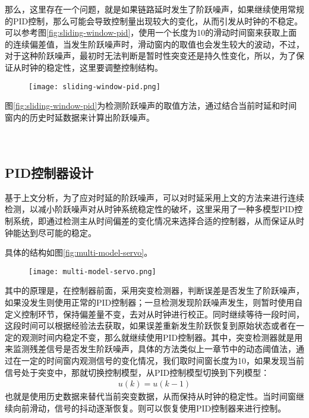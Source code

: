 那么，这里存在一个问题，就是如果链路延时发生了阶跃噪声，如果继续使用常规的PID控制，那么可能会导致控制量出现较大的变化，从而引发从时钟的不稳定。可以参考图\ref{fig:sliding-window-pid}，使用一个长度为10的滑动时间窗来获取上面的连续偏差值，当发生阶跃噪声时，滑动窗内的取值也会发生较大的波动，不过，对于这种阶跃噪声，最初时无法判断是暂时性突变还是持久性变化，所以，为了保证从时钟的稳定性，这里要调整控制结构。

\begin{figure}[htbp]
  \centering
  \begin{minipage}[b]{0.7\textwidth}
   \captionstyle{\centering}
   \centering
   \texttt{[image: sliding-window-pid.png]}
  \end{minipage}     
\end{figure}

图\ref{fig:sliding-window-pid}为检测阶跃噪声的取值方法，通过结合当前时延和时间窗内的历史时延数据来计算出阶跃噪声。
\\ \\ \\
\subsection{PID控制器设计}
基于上文分析，为了应对时延的阶跃噪声，可以对时延采用上文的方法来进行连续检测，以减小阶跃噪声对从时钟系统稳定性的破坏，这里采用了一种多模型PID控制系统，即通过检测主从时间偏差的变化情况来选择合适的控制器，从而保证从时钟能达到尽可能的稳定。

具体的结构如图\ref{fig:multi-model-servo}。
\begin{figure}[htbp]
  \centering
  \begin{minipage}[b]{0.7\textwidth}
   \captionstyle{\centering}
   \centering
   \texttt{[image: multi-model-servo.png]}
  \end{minipage}     
\end{figure}

其中的原理是，在控制器前面，采用突变检测器，判断误差是否发生了阶跃噪声，如果没发生则使用正常的PID控制器；一旦检测发现阶跃噪声发生，则暂时使用自定义控制环节，保持偏差量不变，去对从时钟进行校正。同时继续等待一段时间，这段时间可以根据经验法去获取，如果误差重新发生阶跃恢复到原始状态或者在一定的观测时间内稳定不变，那么就继续使用PID控制器。其中，突变检测器就是用来监测残差信号是否发生阶跃噪声，具体的方法类似上一章节中的动态阈值法，通过在一定的时间窗内观测信号的变化情况，我们取时间窗长度为10，如果发现当前信号处于突变中，那就切换控制模型，从PID控制模型切换到下列模型：
\begin {align}
u(k) = u(k-1)
\end{align}
也就是使用历史数据来替代当前突变数据，从而保持从时钟的稳定性。当时间窗继续向前滑动，信号的抖动逐渐恢复。则可以恢复使用PID控制器来进行控制。


